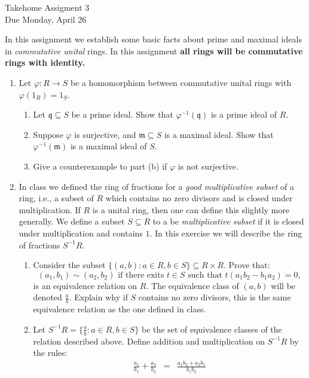 \documentclass[11pt]{article}
\newcommand{\fm}{\mathfrak{m}}
\newcommand{\fq}{\mathfrak{q}}
\begin{document}
\begin{center}
  \Large {Takehome Assigment 3}\\
  \small {Due Monday, April 26}
\end{center}
In this assignment we establish some basic facts about prime and maximal ideals in \textit{commutative unital} rings.  In this assignment \textbf{all rings will be commutative rings with identity.}
\begin{enumerate}
  \item{
  Let $\varphi:R\to S$ be a homomorphism between commutative unital rings with $\varphi(1_R)=1_S$.
  \begin{enumerate}
    \item{
    Let $\fq\subseteq S$ be a prime ideal.  Show that $\varphi^{-1}(\fq)$ is a prime ideal of $R$.
    }
    \item{
    Suppose $\varphi$ is surjective, and $\fm\subseteq S$ is a maximal ideal.  Show that $\varphi^{-1}(\fm)$ is a maximal ideal of $S$.
    }
    \item{
    Give a counterexample to part (b) if $\varphi$ is not surjective.
    }
  \end{enumerate}
  }
  \item{
  In class we defined the ring of fractions for a \textit{good multiplicative subset} of a ring, i.e., a subset of $R$ which contains no zero divisors and is closed under multiplication.  If $R$ is a unital ring, then one can define this slightly more generally.  We define a subset $S\subseteq R$ to a be \textit{multiplicative subset} if it is closed under multiplication and contains $1$.  In this exercise we will describe the ring of fractions $S^{-1}R$.
  \begin{enumerate}
    \item{
    Consider the subset $\{(a,b):a\in R,b\in S\}\subseteq R\times R$.  Prove that:
    \[(a_1,b_1)\sim(a_2,b_2)\text{ if there exits }t\in S\text{ such that }t(a_1b_2-b_1a_2)=0,\]
    is an equivalence relation on $R$.  The equivalence class of $(a,b)$ will be denoted $\frac{a}{b}$.  Explain why if $S$ contains no zero divisors, this is the same equivalence relation as the one defined in class.
    }
    \item{
    Let $S^{-1}R = \{\frac{a}{b}:a\in R,b\in S\}$ be the set of equivalence classes of the relation described above.  Define addition and multiplication on $S^{-1}R$ by the rules:
    \begin{eqnarray*}
      \frac{a_1}{b_1}+\frac{a_2}{b_2} &=& \frac{a_1b_2+a_2b_1}{b_1b_2}\\

\end{eqnarray*}}
\end{enumerate}}
\end{enumerate}
\end{document}

